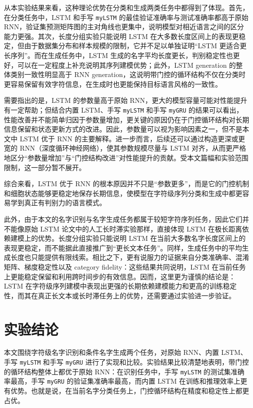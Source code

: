 \documentclass[a4paper]{article}
\begin{document}
从本实验结果来看，这种理论优势在分类和生成两类任务中都得到了体现。首先，在分类任务中，LSTM 和手写 \texttt{myLSTM} 的最佳验证准确率与测试准确率都高于原始 RNN，验证集预测矩阵图的主对角线也更集中，说明模型对相近语言之间的区分能力更强。其次，长度分组实验只能说明 LSTM 在大多数长度区间上的表现更稳定，但由于数据集分布和样本规模的限制，它并不足以单独证明“LSTM 更适合更长序列”。而在生成任务中，LSTM 生成的名字平均长度更长，判别稳定性也更好，可以在一定程度上补充说明其序列建模优势；此外，LSTM generation 的整体类别一致性明显高于 RNN generation，这说明带门控的循环结构不仅在分类时更容易保留有效字符信息，在生成时也更能保持目标语言风格的一致性。

需要指出的是，LSTM 的参数量高于原始 RNN，更大的模型容量可能对性能提升有一定帮助；但结合内置 LSTM、手写 \texttt{myLSTM} 和手写 \texttt{myGRU} 的结果可以看出，性能改善并不能简单归因于参数量增加，更关键的原因仍在于门控循环结构对长期信息保留和状态更新方式的改进。因此，参数量可以视为影响因素之一，但不是本文中 LSTM 优于 RNN 的主要解释。进一步而言，后续还可以通过构造更深或更宽的 RNN（深度循环神经网络），使其参数规模尽量与 LSTM 对齐，从而更严格地区分“参数量增加”与“门控结构改进”对性能提升的贡献。受本文篇幅和实验范围限制，这一部分暂不展开。

综合来看，LSTM 优于 RNN 的根本原因并不只是“参数更多”，而是它的门控机制和细胞状态能够更稳定地保存长期信息，使模型在字符级序列分类和生成中都更容易学到真正有判别力的语言模式。

此外，由于本文的名字识别与名字生成任务都属于较短字符序列任务，因此它们并不能像原始 LSTM 论文中的人工长时滞实验那样，直接体现 LSTM 在极长距离依赖建模上的优势。长度分组实验只能说明 LSTM 在当前大多数名字长度区间上的表现更稳定，而不能据此直接推广到“更长文本任务”。同样，生成任务中的平均生成长度也只能提供有限线索。相比之下，更有说服力的证据来自分类准确率、混淆矩阵、梯度稳定性以及 category fidelity：这些结果共同说明，LSTM 在当前任务上更能稳定保留和利用跨时间步的有效信息。因而，这里更为谨慎的结论是：LSTM 在字符级序列建模中表现出更强的长期依赖建模能力和更高的训练稳定性，而其在真正长文本或长时滞任务上的优势，还需要通过实验进一步验证。

\section{实验结论}
本文围绕字符级名字识别和条件名字生成两个任务，对原始 RNN、内置 LSTM、手写 \texttt{myLSTM} 和手写 \texttt{myGRU} 进行了实现和比较。实验结果比较清楚地表明，带门控的循环结构整体上都优于原始 RNN：在识别任务中，手写 \texttt{myLSTM} 的测试集准确率最高，手写 \texttt{myGRU} 的验证集准确率最高，而内置 LSTM 在训练和推理效率上更有优势。也就是说，在当前名字分类任务上，门控循环结构在精度和稳定性上都更占优。
\end{document}
